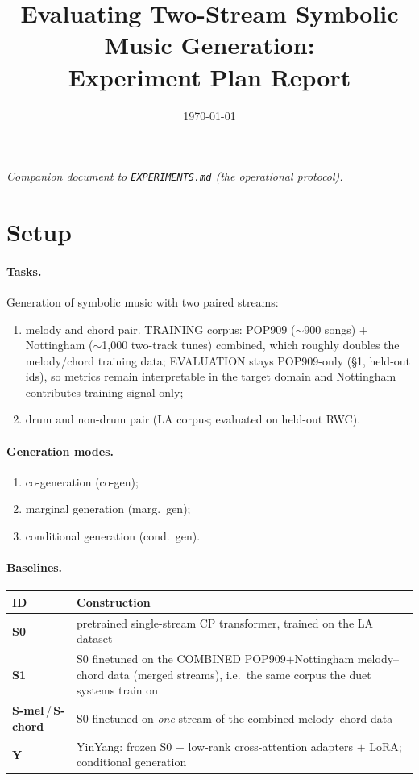 \documentclass[11pt]{article}
\title{Evaluating Two-Stream Symbolic Music Generation:\\ Experiment Plan Report}
\author{}
\date{\today}
\newcommand{\sys}[1]{\textbf{#1}}
\newcommand{\code}[1]{\texttt{#1}}
\begin{document}
\maketitle

\noindent\emph{Companion document to \code{EXPERIMENTS.md} (the
operational protocol).}

\section{Setup}

\paragraph{Tasks.} Generation of symbolic music with two paired
streams:
\begin{enumerate}[nosep]
  \item melody and chord pair. TRAINING corpus: POP909
    ($\sim$900 songs) $+$ Nottingham ($\sim$1{,}000 two-track tunes)
    combined, which roughly doubles the melody/chord training data;
    EVALUATION stays POP909-only (\S1, held-out ids), so metrics remain
    interpretable in the target domain and Nottingham contributes
    training signal only;
  \item drum and non-drum pair (LA corpus; evaluated on held-out RWC).
\end{enumerate}

\paragraph{Generation modes.}
\begin{enumerate}[nosep]
  \item co-generation (co-gen);
  \item marginal generation (marg.\ gen);
  \item conditional generation (cond.\ gen).
\end{enumerate}

\paragraph{Baselines.}
\begin{center}
\begin{tabularx}{\textwidth}{@{}lL@{}}
\toprule
ID & Construction \\
\midrule
\sys{S0} & pretrained single-stream CP transformer, trained on the LA dataset \\
\sys{S1} & S0 finetuned on the COMBINED POP909$+$Nottingham melody--chord data (merged streams), i.e.\ the same corpus the duet systems train on \\
\sys{S-mel}\,/\,\sys{S-chord} & S0 finetuned on \emph{one} stream of the combined melody--chord data \\
\sys{Y} & YinYang: frozen S0 $+$ low-rank cross-attention adapters $+$ LoRA; conditional generation \\
\bottomrule
\end{tabularx}
\end{center}
\end{document}
